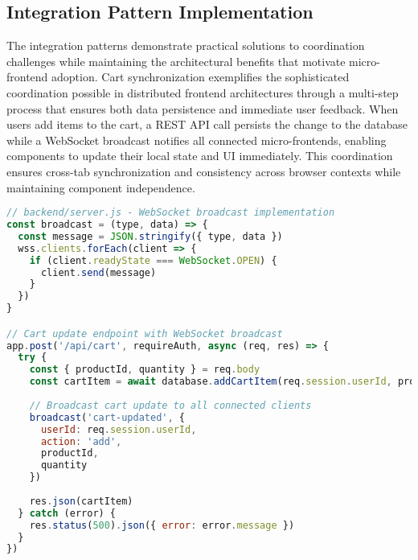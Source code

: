 \documentclass[12pt,a4paper]{report}
\begin{document}
\subsection{Integration Pattern Implementation}

The integration patterns demonstrate practical solutions to coordination challenges while maintaining the architectural benefits that motivate micro-frontend adoption. Cart synchronization exemplifies the sophisticated coordination possible in distributed frontend architectures through a multi-step process that ensures both data persistence and immediate user feedback. When users add items to the cart, a REST API call persists the change to the database while a WebSocket broadcast notifies all connected micro-frontends, enabling components to update their local state and UI immediately. This coordination ensures cross-tab synchronization and consistency across browser contexts while maintaining component independence.

\begin{lstlisting}[language=JavaScript, caption=WebSocket Cart Synchronization - Backend Server]
// backend/server.js - WebSocket broadcast implementation
const broadcast = (type, data) => {
  const message = JSON.stringify({ type, data })
  wss.clients.forEach(client => {
    if (client.readyState === WebSocket.OPEN) {
      client.send(message)
    }
  })
}

// Cart update endpoint with WebSocket broadcast
app.post('/api/cart', requireAuth, async (req, res) => {
  try {
    const { productId, quantity } = req.body
    const cartItem = await database.addCartItem(req.session.userId, productId, quantity)
    
    // Broadcast cart update to all connected clients
    broadcast('cart-updated', { 
      userId: req.session.userId, 
      action: 'add',
      productId, 
      quantity 
    })
    
    res.json(cartItem)
  } catch (error) {
    res.status(500).json({ error: error.message })
  }
})
\end{lstlisting}
\end{document}
